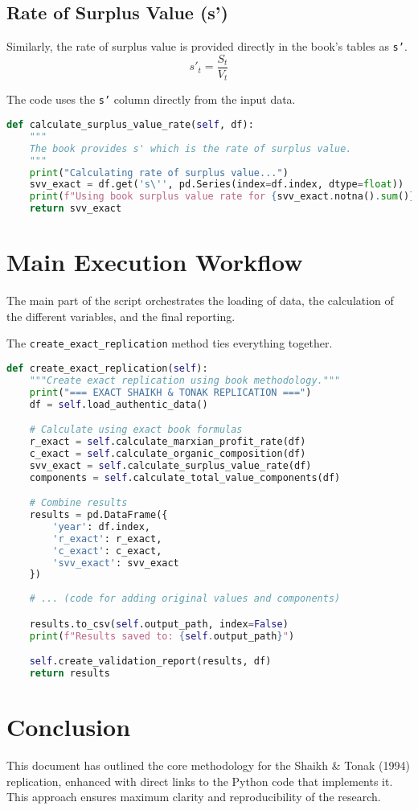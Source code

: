 \documentclass[12pt,a4paper]{article}
\begin{document}
\subsection{Rate of Surplus Value (s')}
Similarly, the rate of surplus value is provided directly in the book's tables as \texttt{s'}.
\begin{equation}
s'_t = \frac{S_t}{V_t}
\end{equation}

\begin{tcolorbox}[colback=purple!5!white,colframe=purple!75!black,title=Implementation for Rate of Surplus Value]
The code uses the \texttt{s'} column directly from the input data.
\begin{lstlisting}[language=Python, caption=Rate of Surplus Value, label=code:surplus_value_rate]
def calculate_surplus_value_rate(self, df):
    """
    The book provides s' which is the rate of surplus value.
    """
    print("Calculating rate of surplus value...")
    svv_exact = df.get('s\'', pd.Series(index=df.index, dtype=float))
    print(f"Using book surplus value rate for {svv_exact.notna().sum()} years")
    return svv_exact
\end{lstlisting}
\end{tcolorbox}

\section{Main Execution Workflow}
The main part of the script orchestrates the loading of data, the calculation of the different variables, and the final reporting.

\begin{tcolorbox}[colback=gray!5!white,colframe=gray!75!black,title=Main Execution Block]
The \texttt{create\_exact\_replication} method ties everything together.
\begin{lstlisting}[language=Python, caption=Main Execution Workflow, label=code:main_execution]
def create_exact_replication(self):
    """Create exact replication using book methodology."""
    print("=== EXACT SHAIKH & TONAK REPLICATION ===")
    df = self.load_authentic_data()

    # Calculate using exact book formulas
    r_exact = self.calculate_marxian_profit_rate(df)
    c_exact = self.calculate_organic_composition(df)
    svv_exact = self.calculate_surplus_value_rate(df)
    components = self.calculate_total_value_components(df)

    # Combine results
    results = pd.DataFrame({
        'year': df.index,
        'r_exact': r_exact,
        'c_exact': c_exact,
        'svv_exact': svv_exact
    })
    
    # ... (code for adding original values and components)

    results.to_csv(self.output_path, index=False)
    print(f"Results saved to: {self.output_path}")

    self.create_validation_report(results, df)
    return results
\end{lstlisting}
\end{tcolorbox}

\section{Conclusion}
This document has outlined the core methodology for the Shaikh \& Tonak (1994) replication, enhanced with direct links to the Python code that implements it. This approach ensures maximum clarity and reproducibility of the research.
\end{document}
